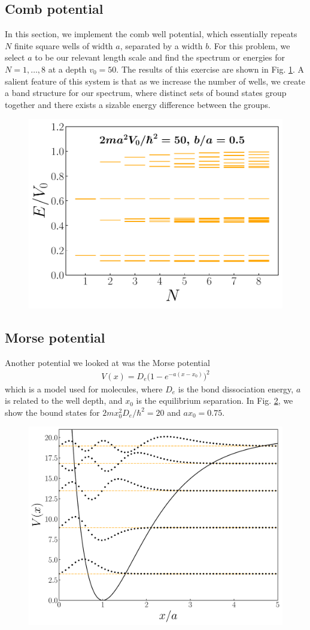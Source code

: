\subsection{Comb potential}
\label{ssec:comb-potential}

In this section, we implement the comb well potential, which essentially repeats $N$ finite square wells of width $a$, separated by a width $b$.
For this problem, we select $a$ to be our relevant length scale and find the spectrum or energies for $N = 1,\ldots,8$ at a depth $v_0 = 50$.
The results of this exercise are shown in Fig. \ref{fig:comb-spectrum}.
A salient feature of this system is that as we increase the number of wells, we create a band structure for our spectrum, where distinct sets of bound states group together and there exists a sizable energy difference between the groups.


\begin{figure}[h!tb]
    \centering
    \includegraphics[width=0.5\linewidth]{comb_spectrum.pdf}
    \caption{}
    \label{fig:comb-spectrum}
\end{figure}



\subsection{Morse potential}
\label{ssec:morse-potential}

Another potential we looked at was the Morse potential
\begin{align}
    V(x) = D_{e} \Big( 1 - e^{-a(x - x_0)} \Big)^2
\end{align}
which is a model used for molecules, where $D_{e}$ is the bond dissociation energy, $a$ is related to the well depth, and $x_0$ is the equilibrium separation.
In Fig. \ref{fig:morse-wfs}, we show the bound states for $2 m x_0^2 D_{e} / \hbar^2 = 20$ and $a x_0 = 0.75$.

\begin{figure}[h!tb]
    \centering
    \includegraphics[width=0.5\linewidth]{morse_wfs.pdf}
    \caption{}
    \label{fig:morse-wfs}
\end{figure}



